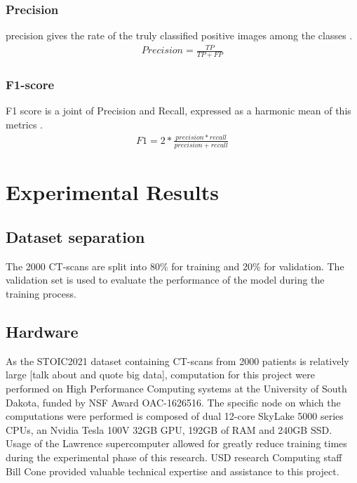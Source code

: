 \documentclass[12pt, letterpaper]{article}
\begin{document}
\subsubsection{Precision}
precision gives the rate of the truly classified positive images among the classes \cite{Karthik_2021}.
\begin{align}
    Precision = \frac{TP}{TP+FP}
\end{align}

\subsubsection{F1-score}
F1 score is a joint of Precision and Recall, expressed as a harmonic mean of this metrics \cite{Karthik_2021}.
\begin{align}
    F1 = 2*\frac{precision*recall}{precision+recall}
\end{align}

\newpage
\section{Experimental Results}

\subsection{Dataset separation}

The 2000 CT-scans are split into 80\% for training and 20\% for validation.  The validation set is used to evaluate the performance of the model during the training process.

\subsection{Hardware}
As the STOIC2021 dataset containing CT-scans from 2000 patients is relatively large [talk about and quote big data], computation for this project were performed on High Performance Computing systems at the University of South Dakota, funded by NSF Award OAC-1626516. The specific node on which the computations were performed is composed of dual 12-core SkyLake 5000 series CPUs, an Nvidia Tesla 100V 32GB GPU, 192GB of RAM and 240GB SSD. Usage of the Lawrence supercomputer allowed for greatly reduce training times during the experimental phase of this research. USD research Computing staff Bill Cone provided valuable technical expertise and assistance to this project.
\end{document}
